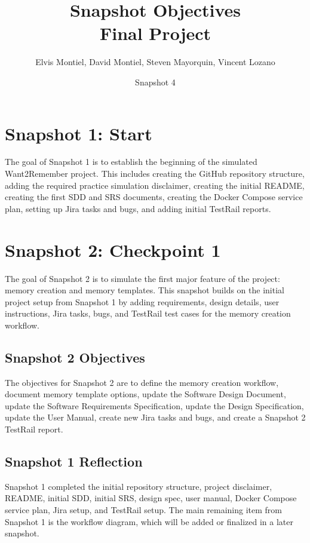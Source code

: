 \documentclass{article}
\title{Snapshot Objectives\\Final Project}
\author{Elvis Montiel, David Montiel, Steven Mayorquin, Vincent Lozano}
\date{Snapshot 4}
\begin{document}
\maketitle

\section{Snapshot 1: Start}

The goal of Snapshot 1 is to establish the beginning of the simulated Want2Remember project. This includes creating the GitHub repository structure, adding the required practice simulation disclaimer, creating the initial README, creating the first SDD and SRS documents, creating the Docker Compose service plan, setting up Jira tasks and bugs, and adding initial TestRail reports.

\section{Snapshot 2: Checkpoint 1}

The goal of Snapshot 2 is to simulate the first major feature of the project: memory creation and memory templates. This snapshot builds on the initial project setup from Snapshot 1 by adding requirements, design details, user instructions, Jira tasks, bugs, and TestRail test cases for the memory creation workflow.

\subsection{Snapshot 2 Objectives}

The objectives for Snapshot 2 are to define the memory creation workflow, document memory template options, update the Software Design Document, update the Software Requirements Specification, update the Design Specification, update the User Manual, create new Jira tasks and bugs, and create a Snapshot 2 TestRail report.

\subsection{Snapshot 1 Reflection}

Snapshot 1 completed the initial repository structure, project disclaimer, README, initial SDD, initial SRS, design spec, user manual, Docker Compose service plan, Jira setup, and TestRail setup. The main remaining item from Snapshot 1 is the workflow diagram, which will be added or finalized in a later snapshot.
\end{document}
